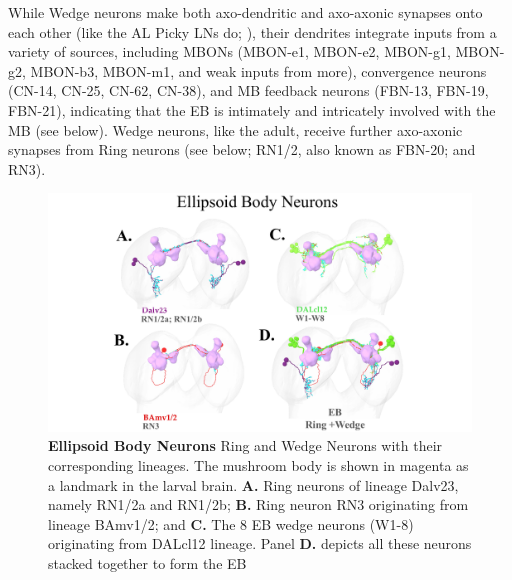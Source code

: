     While Wedge neurons make both axo-dendritic and axo-axonic synapses onto each other (like the AL Picky LNs do; \citep{berck2016wiring}), their dendrites integrate inputs from a variety of sources, including MBONs (MBON-e1, MBON-e2, MBON-g1, MBON-g2, MBON-b3, MBON-m1, and weak inputs from more), convergence neurons (CN-14, CN-25, CN-62, CN-38), and MB feedback neurons (FBN-13, FBN-19, FBN-21), indicating that the EB is intimately and intricately involved with the MB (see below).
    Wedge neurons, like the adult, receive further axo-axonic synapses from Ring neurons (see below; RN1/2, also known as FBN-20; and RN3).
     

        \begin{figure}
            \centering
            \includegraphics[width=12cm]{Figs/CX/EBneurons.pdf}
            \caption{\textbf{Ellipsoid Body Neurons} Ring and Wedge Neurons with their corresponding lineages. The mushroom body is shown in magenta as a landmark in the larval brain. \textbf{A.} Ring neurons of lineage Dalv23, namely RN1/2a and RN1/2b; \textbf{B.} Ring neuron RN3 originating from lineage BAmv1/2; and \textbf{C.} The 8 EB wedge neurons (W1-8) originating from DALcl12 lineage. Panel \textbf{D.} depicts all these neurons stacked together to form the EB}
            \label{EBneurons}
        \end{figure}

